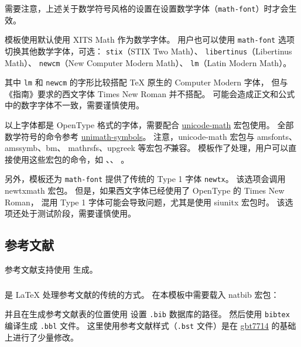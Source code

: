 \documentclass[a4paper]{ltxdoc}
\makeatletter
\DeclareRobustCommand\file{\nolinkurl}
\DeclareRobustCommand\pkg{\textsf}
\DeclareRobustCommand\opt{\texttt}
\def\DescribeOption{\leavevmode\@bsphack\begingroup\MakePrivateLetters
  \Describe@Option}
\def\Describe@Option#1{\endgroup
              \marginpar{\raggedleft\PrintDescribeOption{#1}}%
              \SpecialEnvIndex{#1}\@esphack\ignorespaces}
\makeatother
\begin{document}
需要注意，上述关于数学符号风格的设置在设置数学字体（\opt{math-font}）时才会生效。

\DescribeOption{math-font}
模板使用默认使用 XITS Math 作为数学字体。
用户也可以使用 \opt{math-font} 选项切换其他数学字体，可选：
\opt{stix}（STIX Two Math）、
\opt{libertinus}（Libertinus Math）、
\opt{newcm}（New Computer Modern Math）、
\opt{lm}（Latin Modern Math）。

其中 \opt{lm} 和 \opt{newcm} 的字形比较搭配 TeX 原生的 Computer Modern 字体，
但与《指南》要求的西文字体 Times New Roman 并不搭配。
可能会造成正文和公式中的数字字体不一致，需要谨慎使用。

以上字体都是 OpenType 格式的字体，需要配合
\href{http://mirrors.ctan.org/macros/latex/contrib/unicode-math/unicode-math.pdf}{\pkg{unicode-math}}
宏包使用。
全部数学符号的命令参考
\href{http://mirrors.ctan.org/macros/latex/contrib/unicode-math/unimath-symbols.pdf}{\pkg{unimath-symbols}}。
注意，\pkg{unicode-math} 宏包与 \pkg{amsfonts}、\pkg{amssymb}、\pkg{bm}、
\pkg{mathrsfs}、\pkg{upgreek} 等宏包\emph{不}兼容。
模板作了处理，用户可以直接使用这些宏包的命令，如 、、
。

另外，模板还为 \opt{math-font} 提供了传统的 Type 1 字体 \opt{newtx}。
该选项会调用 \pkg{newtxmath} 宏包。
但是，如果西文字体已经使用了 OpenType 的 Times New Roman，
混用 Type 1 字体可能会导致问题，尤其是使用 \pkg{siunitx} 宏包时。
该选项还处于测试阶段，需要谨慎使用。

\subsection{参考文献}

参考文献支持使用 \BibTeX{} 生成。


\subsubsection{\BibTeX}

\BibTeX{} 是 \LaTeX{} 处理参考文献的传统的方式。
在本模板中需要载入 \pkg{natbib} 宏包：
\begin{latex}
  \usepackage[sort]{natbib}
  
\end{latex}
并且在生成参考文献表的位置使用  设置 \file{.bib} 数据库的路径。
然后使用 \file{bibtex} 编译生成 \file{.bbl} 文件。
这里使用参考文献样式（\file{.bst} 文件）是在
\href{https://ctan.org/pkg/gbt7714}{\pkg{gbt7714}}
的基础上进行了少量修改。
\end{document}
